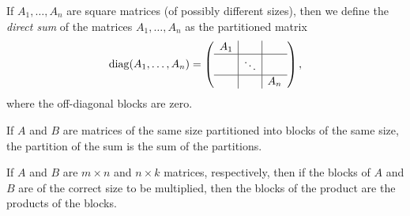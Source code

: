 \documentclass[12pt]{article}
\begin{document}
If $A_1,\ldots, A_n$ are square matrices (of possibly
different sizes), then we define the \emph{direct sum} of
the matrices $A_1,\ldots, A_n$
as the partitioned matrix
$$\operatorname{diag}(A_1,\ldots, A_n) =\left( \begin{array}{c|c|c}
 A_1 &  &  \\
\hline
  & \ddots &  \\
\hline
  &  & A_n \\
 \end{array} \right),$$
where the off-diagonal blocks are zero.

If $A$ and $B$ are matrices of the same size partitioned into blocks of the same size, the partition of the sum is the sum of the partitions.

If $A$ and $B$ are $m\times n$ and $n\times k$ matrices, respectively, then if the blocks of $A$ and $B$ are of the correct size to be multiplied, then the blocks of the product are the products of the blocks.
\end{document}
